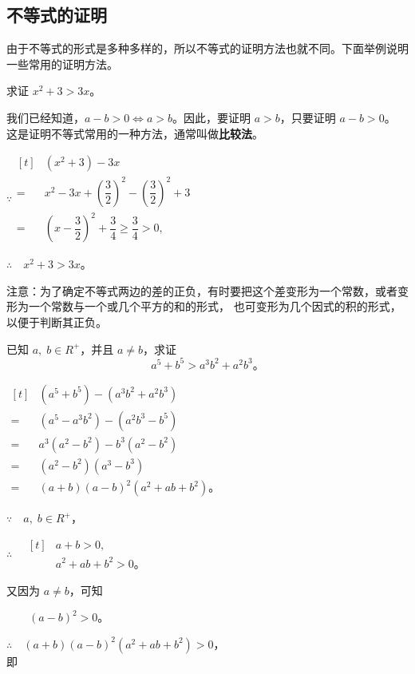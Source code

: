 \subsection{不等式的证明}\label{subsec:3-3}

由于不等式的形式是多种多样的，所以不等式的证明方法也就不同。下面举例说明一些常用的证明方法。

\liti 求证 $x^2 + 3 > 3x$。

我们已经知道，$a - b > 0 \iff a > b$。因此，要证明 $a > b$，只要证明 $a - b > 0$。
这是证明不等式常用的一种方法，通常叫做\textbf{比较法}。

\zhengming \; $\because \begin{aligned}[t]
    & (x^2 + 3) - 3x \\
={} & x^2 - 3x + \left( \dfrac{3}{2} \right)^2 - \left( \dfrac{3}{2} \right)^2 + 3 \\
={} & \left( x - \dfrac{3}{2} \right)^2 + \dfrac{3}{4} \geqslant \dfrac{3}{4} > 0,
\end{aligned}$

$\therefore \quad x^2 + 3 > 3x$。

注意：为了确定不等式两边的差的正负，有时要把这个差变形为一个常数，或者变形为一个常数与一个或几个平方的和的形式，
也可变形为几个因式的积的形式，以便于判断其正负。


\liti 已知 $a,\; b \in R^+$，并且 $a \neq b$，求证
$$ a^5 + b^5 > a^3b^2 + a^2b^3 \text{。} $$

\zhengming $\begin{aligned}[t]
        & (a^5 + b^5) - (a^3b^2 + a^2b^3) \\
    ={} & (a^5 - a^3b^2) - (a^2b^3 - b^5) \\
    ={} & a^3(a^2 - b^2) - b^3(a^2 - b^2) \\
    ={} & (a^2 - b^2)(a^3 - b^3) \\
    ={} & (a + b)(a - b)^2(a^2 + ab + b^2) \text{。}
\end{aligned}$

$\because \quad a,\; b \in R^+$，

$\therefore \quad \begin{aligned}[t]
    & a + b > 0, \\
    & a^2 + ab + b^2 > 0 \text{。}
\end{aligned}$

又因为 $a \neq b$，可知

$\qquad (a - b)^2 > 0$。

$\therefore \quad (a + b)(a - b)^2(a^2 + ab + b^2) > 0$，\\
即

